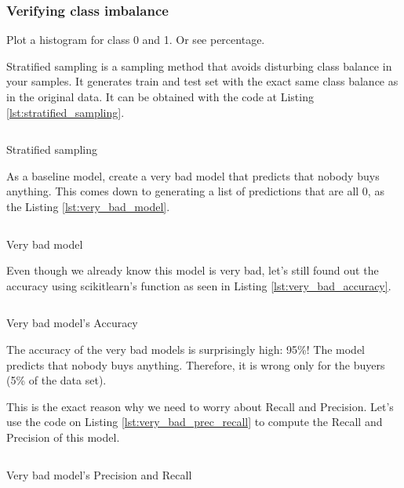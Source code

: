 \hypertarget{verifying-class-imbalance}{%
\subsubsection{Verifying class
imbalance}\label{verifying-class-imbalance}}

Plot a histogram for class 0 and 1. Or see percentage.

Stratified sampling is a sampling method that avoids disturbing class
balance in your samples. It generates train and test set with the exact
same class balance as in the original data. It can be obtained with the
code at Listing \ref{lst:stratified_sampling}.

\begin{listing}[htp]
  \inputminted{python}{code/stratified_train_test.py}
  \caption{Stratified sampling}
  \label{lst:stratified_sampling}
\end{listing}

As a baseline model, create a very bad model that predicts that nobody
buys anything. This comes down to generating a list of predictions that
are all 0, as the Listing \ref{lst:very_bad_model}.

\begin{listing}[htp]
  \inputminted{python}{code/very_bad_model.py}
  \caption{Very bad model}
  \label{lst:very_bad_model}
\end{listing}

Even though we already know this model is very bad, let's still found
out the accuracy using scikitlearn's function as seen in Listing
\ref{lst:very_bad_accuracy}.

\begin{listing}[htp]
  \inputminted{python}{code/very_bad_accuracy.py}
  \caption{Very bad model's Accuracy}
  \label{lst:very_bad_accuracy}
\end{listing}

The accuracy of the very bad models is surprisingly high: 95\%! The
model predicts that nobody buys anything. Therefore, it is wrong only
for the buyers (5\% of the data set).

This is the exact reason why we need to worry about Recall and
Precision. Let's use the code on Listing \ref{lst:very_bad_prec_recall}
to compute the Recall and Precision of this model.

\begin{listing}[htp]
  \inputminted{python}{code/very_bad_prec_recall.py}
  \caption{Very bad model's Precision and Recall}
  \label{lst:very_bad_prec_recall}
\end{listing}

